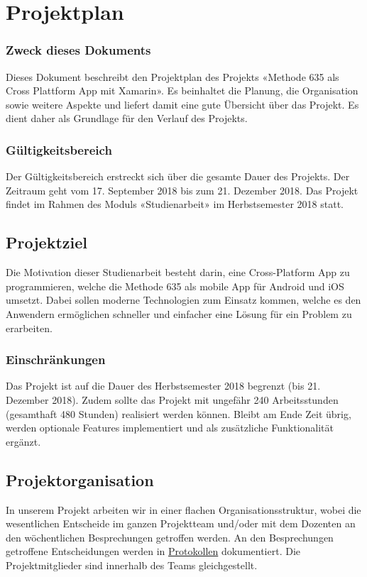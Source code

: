 \section{Projektplan}

\subsubsection*{Zweck dieses Dokuments}
Dieses Dokument beschreibt den Projektplan des Projekts «Methode 635 als Cross Plattform App mit Xamarin». Es beinhaltet die Planung, die Organisation sowie weitere Aspekte und liefert damit eine gute Übersicht über das Projekt. Es dient daher als Grundlage für den Verlauf des Projekts.

\subsubsection*{Gültigkeitsbereich}
Der Gültigkeitsbereich erstreckt sich über die gesamte Dauer des Projekts. Der Zeitraum geht vom 17. September 2018 bis zum 21. Dezember 2018. Das Projekt findet im Rahmen des Moduls «Studienarbeit» im Herbstsemester 2018 statt.

\subsection{Projektziel}
Die Motivation dieser Studienarbeit besteht darin, eine Cross-Platform App zu programmieren, welche die Methode 635 \cite{methode-635} als mobile App für Android und iOS umsetzt. Dabei sollen moderne Technologien zum Einsatz kommen, welche es den Anwendern ermöglichen schneller und einfacher eine Lösung für ein Problem zu erarbeiten.

\subsubsection*{Einschränkungen}
Das Projekt ist auf die Dauer des Herbstsemester 2018 begrenzt (bis 21. Dezember 2018). Zudem sollte das Projekt mit ungefähr 240 Arbeitsstunden (gesamthaft 480 Stunden) realisiert werden können. Bleibt am Ende Zeit übrig, werden optionale Features implementiert und als zusätzliche Funktionalität ergänzt.

\subsection{Projektorganisation}
In unserem Projekt arbeiten wir in einer flachen Organisationsstruktur, wobei die wesentlichen Entscheide im ganzen Projektteam und/oder mit dem Dozenten an den wöchentlichen Besprechungen getroffen werden. An den Besprechungen getroffene Entscheidungen werden in \href{https://github.com/BrainingOutOfBox/Doc/wiki} {Protokollen} dokumentiert. Die Projektmitglieder sind innerhalb des Teams gleichgestellt.

